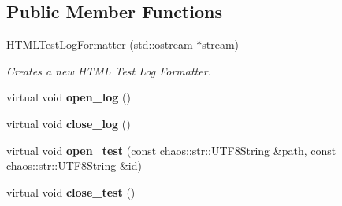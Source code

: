 \subsection*{Public Member Functions}
\begin{DoxyCompactItemize}
\item 
\hypertarget{classchaos_1_1test_1_1log__formatter_1_1_h_t_m_l_test_log_formatter_a62020a38f80ca01d58cac2bc04cd7044}{}\hyperlink{classchaos_1_1test_1_1log__formatter_1_1_h_t_m_l_test_log_formatter_a62020a38f80ca01d58cac2bc04cd7044}{H\+T\+M\+L\+Test\+Log\+Formatter} (std\+::ostream $\ast$stream)\label{classchaos_1_1test_1_1log__formatter_1_1_h_t_m_l_test_log_formatter_a62020a38f80ca01d58cac2bc04cd7044}

\begin{DoxyCompactList}\small\item\em Creates a new H\+T\+M\+L Test Log Formatter. \end{DoxyCompactList}\item 
\hypertarget{classchaos_1_1test_1_1log__formatter_1_1_h_t_m_l_test_log_formatter_a60da960b069095f4df29d02ede1f4b78}{}virtual void {\bfseries open\+\_\+log} ()\label{classchaos_1_1test_1_1log__formatter_1_1_h_t_m_l_test_log_formatter_a60da960b069095f4df29d02ede1f4b78}

\item 
\hypertarget{classchaos_1_1test_1_1log__formatter_1_1_h_t_m_l_test_log_formatter_a590f4ba75c06576df9b07720fbcc851e}{}virtual void {\bfseries close\+\_\+log} ()\label{classchaos_1_1test_1_1log__formatter_1_1_h_t_m_l_test_log_formatter_a590f4ba75c06576df9b07720fbcc851e}

\item 
\hypertarget{classchaos_1_1test_1_1log__formatter_1_1_h_t_m_l_test_log_formatter_a8b8e1cefd176eca4680b407eea5f42cc}{}virtual void {\bfseries open\+\_\+test} (const \hyperlink{classchaos_1_1str_1_1_u_t_f8_string}{chaos\+::str\+::\+U\+T\+F8\+String} \&path, const \hyperlink{classchaos_1_1str_1_1_u_t_f8_string}{chaos\+::str\+::\+U\+T\+F8\+String} \&id)\label{classchaos_1_1test_1_1log__formatter_1_1_h_t_m_l_test_log_formatter_a8b8e1cefd176eca4680b407eea5f42cc}

\item 
\hypertarget{classchaos_1_1test_1_1log__formatter_1_1_h_t_m_l_test_log_formatter_a50aa9b6f10663fd15c3b08535704429d}{}virtual void {\bfseries close\+\_\+test} ()\label{classchaos_1_1test_1_1log__formatter_1_1_h_t_m_l_test_log_formatter_a50aa9b6f10663fd15c3b08535704429d}

\end{DoxyCompactItemize}

